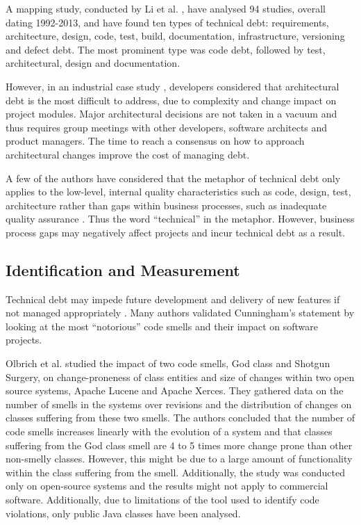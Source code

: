 \documentclass{mprop}
\begin{document}
A mapping study, conducted by Li et al. \cite{Li2015}, have analysed 94 studies,
overall dating 1992-2013, and have found ten types of technical debt:
requirements, architecture, design, code, test, build, documentation,
infrastructure, versioning and defect debt. The most prominent type was code
debt, followed by test, architectural, design and documentation.

However, in an industrial case study \cite{Codabux2013}, developers considered
that architectural debt is the most difficult to address, due to complexity and
change impact on project modules. Major architectural decisions are not taken in
a vacuum and thus requires group meetings with other developers, software
architects and product managers. The time to reach a consensus on how to
approach architectural changes improve the cost of managing debt.

A few of the authors have considered that the metaphor of technical debt only
applies to the low-level, internal quality characteristics such as code, design,
test, architecture rather than gaps within business processes, such as
inadequate quality assurance \cite{Theodoropoulos2011} \cite{Nugroho2011}. Thus
the word ``technical'' in the metaphor. However, business process gaps may
negatively affect projects and incur technical debt as a result.

\subsection{Identification and Measurement}


Technical debt may impede future development and delivery of new features if not
managed appropriately \cite{Cunningham1993}. Many authors validated Cunningham's
statement by looking at the most ``notorious'' code smells \cite{Fowler1999} and
their impact on software projects.

Olbrich et al. \cite{Olbrich2009} studied the impact of two code smells, God
class and Shotgun Surgery, on change-proneness of class entities and size of
changes within two open source systems, Apache Lucene and Apache Xerces. They
gathered data on the number of smells in the systems over revisions and the
distribution of changes on classes suffering from these two smells. The authors
concluded that the number of code smells increases linearly with the evolution
of a system and that classes suffering from the God class smell are 4 to 5 times
more change prone than other non-smelly classes. However, this might be due to a
large amount of functionality within the class suffering from the smell.
Additionally, the study was conducted only on open-source systems and the
results might not apply to commercial software. Additionally, due to limitations
of the tool used to identify code violations, only public Java classes have been
analysed.
\end{document}
